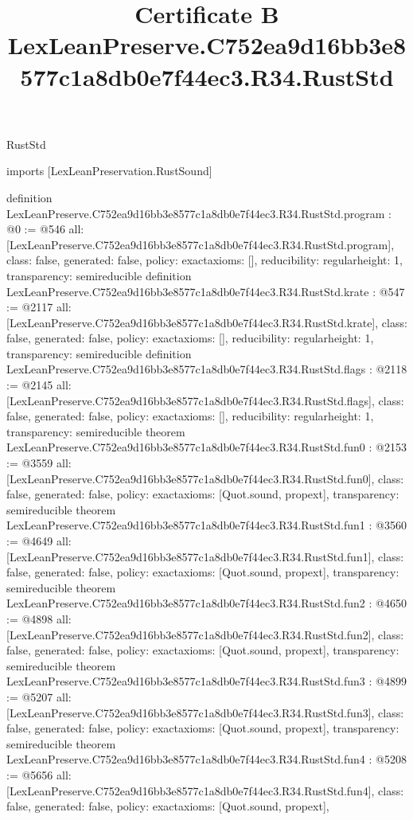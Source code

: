 \begin{lexlean}{RustStd}
\title{Certificate B LexLeanPreserve.C752ea9d16bb3e8577c1a8db0e7f44ec3.R34.RustStd}
\begin{coremodule}
imports [LexLeanPreservation.RustSound]

definition LexLeanPreserve.C752ea9d16bb3e8577c1a8db0e7f44ec3.R34.RustStd.program : @0 := @546 {
  all: [LexLeanPreserve.C752ea9d16bb3e8577c1a8db0e7f44ec3.R34.RustStd.program],
  class: false,
  generated: false,
  policy: exact{axioms: []},
  reducibility: regular{height: 1},
  transparency: semireducible
}
definition LexLeanPreserve.C752ea9d16bb3e8577c1a8db0e7f44ec3.R34.RustStd.krate : @547 := @2117 {
  all: [LexLeanPreserve.C752ea9d16bb3e8577c1a8db0e7f44ec3.R34.RustStd.krate],
  class: false,
  generated: false,
  policy: exact{axioms: []},
  reducibility: regular{height: 1},
  transparency: semireducible
}
definition LexLeanPreserve.C752ea9d16bb3e8577c1a8db0e7f44ec3.R34.RustStd.flags : @2118 := @2145 {
  all: [LexLeanPreserve.C752ea9d16bb3e8577c1a8db0e7f44ec3.R34.RustStd.flags],
  class: false,
  generated: false,
  policy: exact{axioms: []},
  reducibility: regular{height: 1},
  transparency: semireducible
}
theorem LexLeanPreserve.C752ea9d16bb3e8577c1a8db0e7f44ec3.R34.RustStd.fun0 : @2153 := @3559 {
  all: [LexLeanPreserve.C752ea9d16bb3e8577c1a8db0e7f44ec3.R34.RustStd.fun0],
  class: false,
  generated: false,
  policy: exact{axioms: [Quot.sound, propext]},
  transparency: semireducible
}
theorem LexLeanPreserve.C752ea9d16bb3e8577c1a8db0e7f44ec3.R34.RustStd.fun1 : @3560 := @4649 {
  all: [LexLeanPreserve.C752ea9d16bb3e8577c1a8db0e7f44ec3.R34.RustStd.fun1],
  class: false,
  generated: false,
  policy: exact{axioms: [Quot.sound, propext]},
  transparency: semireducible
}
theorem LexLeanPreserve.C752ea9d16bb3e8577c1a8db0e7f44ec3.R34.RustStd.fun2 : @4650 := @4898 {
  all: [LexLeanPreserve.C752ea9d16bb3e8577c1a8db0e7f44ec3.R34.RustStd.fun2],
  class: false,
  generated: false,
  policy: exact{axioms: [Quot.sound, propext]},
  transparency: semireducible
}
theorem LexLeanPreserve.C752ea9d16bb3e8577c1a8db0e7f44ec3.R34.RustStd.fun3 : @4899 := @5207 {
  all: [LexLeanPreserve.C752ea9d16bb3e8577c1a8db0e7f44ec3.R34.RustStd.fun3],
  class: false,
  generated: false,
  policy: exact{axioms: [Quot.sound, propext]},
  transparency: semireducible
}
theorem LexLeanPreserve.C752ea9d16bb3e8577c1a8db0e7f44ec3.R34.RustStd.fun4 : @5208 := @5656 {
  all: [LexLeanPreserve.C752ea9d16bb3e8577c1a8db0e7f44ec3.R34.RustStd.fun4],
  class: false,
  generated: false,
  policy: exact{axioms: [Quot.sound, propext]},
}
\end{coremodule}
\end{lexlean}
